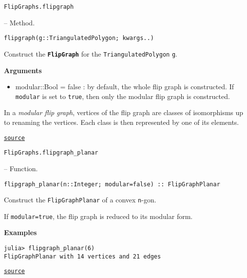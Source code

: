 \hypertarget{8931391207780679550}{\texttt{FlipGraphs.flipgraph}}  -- {Method.}

\begin{adjustwidth}{2em}{0pt}


\begin{verbatim}
flipgraph(g::TriangulatedPolygon; kwargs..)
\end{verbatim}

Construct the \textbf{\texttt{FlipGraph}} for the \texttt{TriangulatedPolygon} \texttt{g}.

\textbf{Arguments}

\begin{itemize}
\item {\textquotesingle}modular::Bool = false{\textquotesingle} : by default, the whole flip graph is constructed. If \texttt{modular} is set to \texttt{true}, then only the modular flip graph is constructed.

\end{itemize}
In a \emph{modular flip graph}, vertices of the flip graph are classes of isomorphisms up to renaming the vertices.  Each class is then represented by one of its elements.



\href{https://github.com/schto223/FlipGraphs.jl/blob/490c01a7adf74b42f27dda05099165c47ae8133e/src/flipGraphPlanar.jl#L118-L127}{\texttt{source}}


\end{adjustwidth}
\hypertarget{7158471706617452188}{\texttt{FlipGraphs.flipgraph\_planar}}  -- {Function.}

\begin{adjustwidth}{2em}{0pt}


\begin{verbatim}
flipgraph_planar(n::Integer; modular=false) :: FlipGraphPlanar
\end{verbatim}

Construct the \texttt{FlipGraphPlanar} of a convex \texttt{n}-gon. 

If \texttt{modular=true}, the flip graph is reduced to its modular form.

\textbf{Examples}


\begin{verbatim}
julia> flipgraph_planar(6)
FlipGraphPlanar with 14 vertices and 21 edges
\end{verbatim}



\href{https://github.com/schto223/FlipGraphs.jl/blob/490c01a7adf74b42f27dda05099165c47ae8133e/src/flipGraphPlanar.jl#L300-L312}{\texttt{source}}


\end{adjustwidth}

